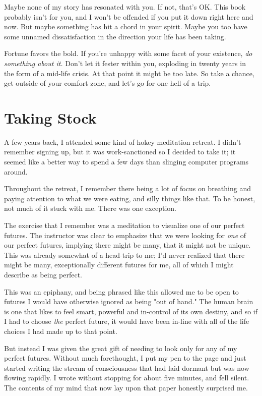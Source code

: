 \documentclass[]{book}
\newcommand{\emphasis}[1]{\textit{#1}}
\begin{document}
Maybe none of my story has resonated with you. If not, that's OK. This book
probably isn't for you, and I won't be offended if you put it down right here
and now. But maybe something has hit a chord in your spirit. Maybe you too have
some unnamed dissatisfaction in the direction your life has been taking.

Fortune favors the bold. If you're unhappy with some facet of your existence,
\emphasis{do something about it.} Don't let it fester within you, exploding in
twenty years in the form of a mid-life crisis. At that point it might be too
late. So take a chance, get outside of your comfort zone, and let's go for one
hell of a trip.


\chapter{Taking Stock}

A few years back, I attended some kind of hokey meditation retreat. I didn't
remember signing up, but it was work-sanctioned so I decided to take it; it
seemed like a better way to spend a few days than slinging computer programs
around.

Throughout the retreat, I remember there being a lot of focus on breathing and
paying attention to what we were eating, and silly things like that. To be
honest, not much of it stuck with me. There was one exception.

The exercise that I remember was a meditation to visualize one of our perfect
futures. The instructor was clear to emphasize that we were looking for
\emphasis{one} of our perfect futures, implying there might be many, that it
might not be unique. This was already somewhat of a head-trip to me; I'd never
realized that there might be many, exceptionally different futures for me, all
of which I might describe as being perfect.

This was an epiphany, and being phrased like this allowed me to be open to
futures I would have otherwise ignored as being "out of hand." The human brain
is one that likes to feel smart, powerful and in-control of its own destiny, and
so if I had to choose \emphasis{the} perfect future, it would have been in-line
with all of the life choices I had made up to that point.

But instead I was given the great gift of needing to look only for any of my
perfect futures. Without much forethought, I put my pen to the page and just
started writing the stream of consciousness that had laid dormant but was now
flowing rapidly. I wrote without stopping for about five minutes, and fell
silent. The contents of my mind that now lay upon that paper honestly surprised
me.
\end{document}
